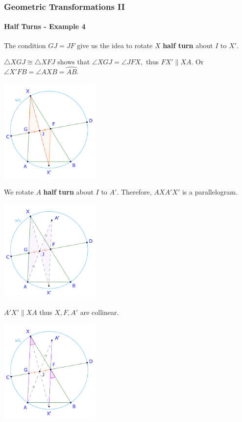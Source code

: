 \documentclass[8pt,xcolor=table,dvipsnames]{beamer}
\newcommand{\arc}[1]{\wideparen{#1}}
\begin{document}
\begin{frame}[t]
    \frametitle{Geometric Transformations II}
    \framesubtitle{Half Turns - Example 4}
    \begin{overprint}
        The condition $GJ=JF$ give us the idea to rotate $X$ \textbf{half turn} about $I$ to $X'$.
        
        \bigbreak
        $\triangle XGJ \cong \triangle XFJ$ shows that $\angle XGJ = \angle JFX,$ thus $FX' \parallel XA.$
        Or $\angle X'FB = \angle AXB = \arc{AB}.$
        \begin{center}
            \includegraphics[width=5cm]{./svg/pdf/rotation-3b.pdf}
        \end{center}
        We rotate $A$ \textbf{half turn} about $I$ to $A'$.
        Therefore, $AXA'X'$ is a parallelogram.
        \begin{center}
            \includegraphics[width=5cm]{./svg/pdf/rotation-3c.pdf}
        \end{center}
        $A'X'\parallel XA$ thus $X, F, A'$ are collinear.
        \begin{center}
            \includegraphics[width=5cm]{./svg/pdf/rotation-3d.pdf}

\end{center}
\end{overprint}
\end{frame}
\end{document}
